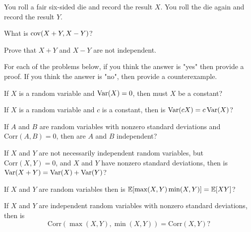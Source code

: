 \documentclass[11pt]{article}
\begin{document}

\begin{Parts}
	\Part You roll a fair six-sided die and record the result $X$. You roll the die again and record the result $Y$.  
	\begin{Parts}
		\item What is $\operatorname{cov} (X+Y, X-Y)$?
		\item Prove that $X+Y$ and $X-Y$ are not independent.
	\end{Parts}

\end{Parts}

For each of the problems below, if you think the answer is "yes" then provide a proof. If you think the answer is "no", then provide a counterexample.

\begin{Parts}[resume]
	
	\Part If $X$ is a random variable and $\operatorname{Var} (X) = 0$, then must $X$ be a constant?
	

	\Part If $X$ is a random variable and $c$ is a constant, then is $\operatorname{Var} (cX) = c \operatorname{Var} (X)$?
	

	\Part If $A$ and $B$ are random variables with nonzero standard deviations and $\text{Corr} (A, B) = 0$, then are $A$ and $B$ independent?
	

	\Part If $X$ and $Y$ are not necessarily independent random variables, but $\text{Corr} (X, Y) = 0$, and $X$ and $Y$ have nonzero standard deviations, then is $\operatorname{Var} (X+Y) = \operatorname{Var}(X) + \operatorname{Var}(Y)$?
	
\end{Parts}
	

\begin{Parts}[resume]
	\Part If $X$ and $Y$ are random variables then is $\operatorname{\mathbb{E}}[\max (X, Y) \min (X, Y)] = \operatorname{\mathbb{E}}[X Y]$?
	

	\Part If $X$ and $Y$ are independent random variables with nonzero standard deviations, then is $$\text{Corr} (\max (X, Y), \min (X, Y)) = \text{Corr} (X, Y) ?$$
	
\end{Parts}

\end{document}
